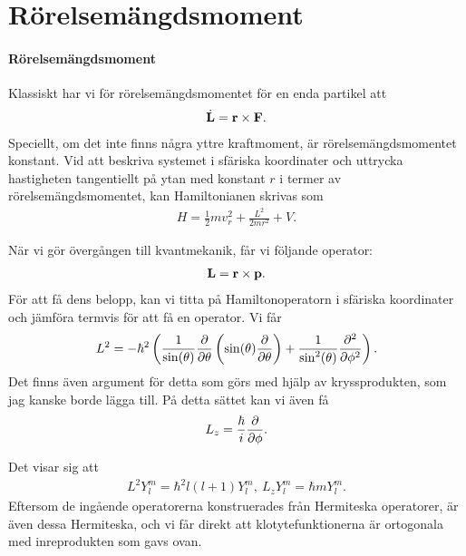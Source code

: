 \section{Rörelsemängdsmoment}

\paragraph{Rörelsemängdsmoment}
Klassiskt har vi för rörelsemängdsmomentet för en enda partikel att
\begin{align*}
	\dot{\vb{L}} = \vb{r}\times\vb{F}.
\end{align*}
Speciellt, om det inte finns några yttre kraftmoment, är rörelsemängdsmomentet konstant. Vid att beskriva systemet i sfäriska koordinater och uttrycka hastigheten tangentiellt på ytan med konstant $r$ i termer av rörelsemängdsmomentet, kan Hamiltonianen skrivas som
\begin{align*}
	H = \frac{1}{2}mv_{r}^{2} + \frac{L^{2}}{2mr^{2}} + V.
\end{align*}

När vi gör övergången till kvantmekanik, får vi följande operator:
\begin{align*}
	\vb{L} = \vb{r}\times\vb{p}.
\end{align*}
För att få dens belopp, kan vi titta på Hamiltonoperatorn i sfäriska koordinater och jämföra termvis för att få en operator. Vi får
\begin{align*}
	L^{2} = -\hbar^{2}\left(\frac{1}{\sin(\theta)}\pdv{\theta}\left(\sin(\theta)\pdv{\theta}\right) + \frac{1}{\sin^{2}(\theta)}\pdv[2]{\phi}\right).
\end{align*}
Det finns även argument för detta som görs med hjälp av kryssprodukten, som jag kanske borde lägga till. På detta sättet kan vi även få
\begin{align*}
	L_{z} = \frac{\hbar}{i}\pdv{\phi}.
\end{align*}

Det visar sig att
\begin{align*}
	L^{2}Y_{l}^{m} = \hbar^{2}l(l + 1)Y_{l}^{m},\ L_{z}Y_{l}^{m} = \hbar mY_{l}^{m}.
\end{align*}
Eftersom de ingående operatorerna konstruerades från Hermiteska operatorer, är även dessa Hermiteska, och vi får direkt att klotytefunktionerna är ortogonala med inreprodukten som gavs ovan.

